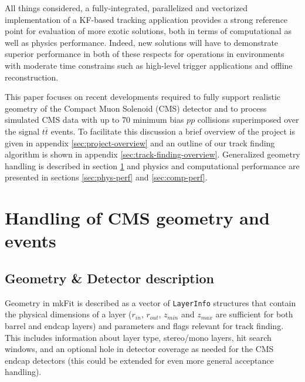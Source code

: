 \documentclass{webofc}
\def\mkfit{mkFit\xspace}
\def\stt#1{{\small\texttt{#1}}}
\begin{document}
All things considered, a fully-integrated, parallelized and vectorized implementation 
of a KF-based tracking application provides a strong reference point for evaluation 
of more exotic solutions, both in terms of computational as well as physics performance. 
Indeed, new solutions will have to demonstrate superior performance in both of these 
respects for operations in environments with moderate time constrains such as high-level 
trigger applications and offline reconstruction.

This paper focuses on recent developments required to fully support realistic
geometry of the Compact Muon Solenoid (CMS) detector and to process simulated CMS data
with up to 70 minimum bias $pp$ collisions superimposed over the signal $t\bar{t}$
events. To facilitate this discussion a brief overview of the project is given
in appendix \ref{sec:project-overview} and an outline of our track finding
algorithm is shown in appendix \ref{sec:track-finding-overview}. Generalized
geometry handling is described in section \ref{sec:cms-geom-and-events} and
physics and computational performance are presented in sections
\ref{sec:phys-perf} and \ref{sec:comp-perf}.


\section{Handling of CMS geometry and events}
\label{sec:cms-geom-and-events}

\subsection{Geometry \& Detector description}

Geometry in \mkfit is described as a vector of \stt{LayerInfo} structures
that contain the physical dimensions of a layer ($r_{in}$, $r_{out}$, $z_{min}$
and $z_{max}$ are sufficient for both barrel and endcap layers) and parameters
and flags relevant for track finding. This includes information about layer
type, stereo/mono layers, hit search windows, and an optional hole in detector
coverage as needed for the CMS endcap detectors (this could be extended for
even more general acceptance handling).
\end{document}
